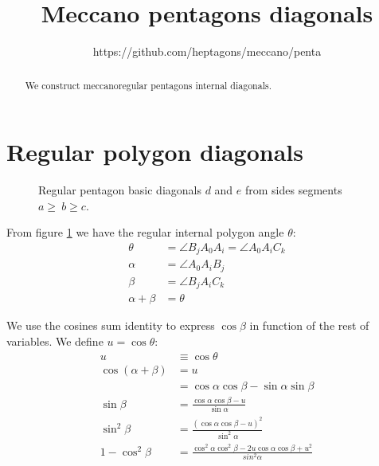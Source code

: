 \documentclass[11pt]{article}
\title{\textbf{Meccano pentagons diagonals}}
\author{https://github.com/heptagons/meccano/penta}
\date{}
\begin{document}
\maketitle
\begin{abstract}
We construct meccano\meccanoref regular pentagons internal diagonals.
\end{abstract}

\section{Regular polygon diagonals}

\begin{figure}[H]
\centering
{}
\caption{Regular pentagon basic diagonals $d$ and $e$ from sides segments $a\ge\ b\ge c$.}
\label{fig:diagonals}
\end{figure}

From figure \ref{fig:diagonals} we have the regular internal polygon angle $\theta$:
\begin{align}
\theta &= \angle{B_jA_0A_i} = \angle{A_0A_iC_k}\\
\alpha &= \angle{A_0A_iB_j} \\
\beta  &= \angle{B_jA_iC_k} \\
\alpha + \beta &= \theta
\end{align}

We use the cosines sum identity to express $\cos\beta$ in function of the rest of variables.
We define $u = \cos\theta$:
\begin{align}
u &\equiv \cos\theta\\
\cos(\alpha + \beta) &= u\\
 &= \cos\alpha\cos\beta - \sin\alpha\sin\beta\\
\sin\beta &= \frac{\cos\alpha\cos\beta - u}{\sin\alpha}\\
\sin^2\beta &= \frac{(\cos\alpha\cos\beta - u)^2}{\sin^2\alpha}\\
1 - \cos^2\beta &= \frac{\cos^2\alpha\cos^2\beta - 2u\cos\alpha\cos\beta + u^2}{sin^2\alpha}
\end{align}
\end{document}
